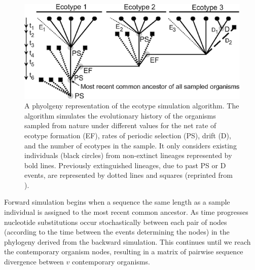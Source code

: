 \begin{figure}[h!]

  \centering
   \includegraphics{images/Speciation-CH2}
   \caption[Detailed phylogeny with putative ecotype simulation events.]{A phyolgeny representation of the ecotype simulation algorithm. The algorithm simulates the evolutionary history of the organisms sampled from nature under different values for the net rate of ecotype formation (EF), rates of periodic selection (PS), drift (D), and the number of ecotypes in the sample. It only considers existing individuals (black circles) from non-extinct lineages represented by bold lines. Previously extinguished lineages, due to past PS or D events, are represented by dotted lines and squares (reprinted from \protect\cite{koeppel2008identifying}).}
   \label{fig:SpeciationGraph}
\end{figure}

Forward simulation begins when a sequence the same length as a sample individual is assigned to the most recent common ancestor.
As time progresses nucleotide substitutions occur stochastically between each pair of nodes (according to the time between the events determining the nodes) in the phylogeny derived from the backward simulation. 
This continues until we reach the contemporary organism nodes, resulting in a matrix of pairwise sequence divergence between $v$ contemporary organisms.

